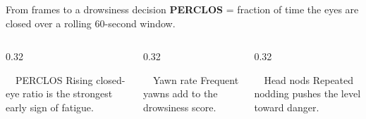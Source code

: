 \documentclass[aspectratio=169, 10pt]{beamer}
\begin{document}
\begin{frame}{From frames to a drowsiness decision}
  \vspace{0.2em}
  {\footnotesize \textbf{PERCLOS} = fraction of time the eyes are closed over a rolling 60-second window.}
  \vspace{0.5em}
  \begin{center}
  \end{center}
  \vspace{0.4em}
  \begin{columns}[T]
    \begin{column}{0.32\textwidth}
      \begin{card}{\faEye~~PERCLOS}
        \scriptsize Rising closed-eye ratio is the strongest early sign of fatigue.
      \end{card}
    \end{column}
    \begin{column}{0.32\textwidth}
      \begin{card}{\faSmileBeam~~Yawn rate}
        \scriptsize Frequent yawns add to the drowsiness score.
      \end{card}
    \end{column}
    \begin{column}{0.32\textwidth}
      \begin{card}{\faArrowDown~~Head nods}
        \scriptsize Repeated nodding pushes the level toward danger.
      \end{card}
    \end{column}
  \end{columns}
\end{frame}
\end{document}
